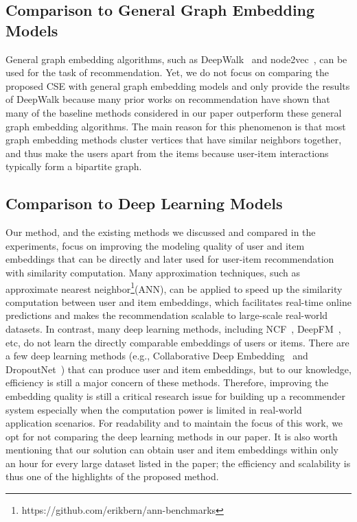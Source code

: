 \documentclass[sigconf,anonymous=false]{acmart}
\begin{document}
\subsection{Comparison to General Graph Embedding Models}
\label{sec:ge}
General graph embedding algorithms, such as DeepWalk~\cite{dw} and
node2vec~\cite{n2v}, can be used for the task of recommendation.
Yet, we do not focus on comparing the proposed CSE with general graph embedding
models and only provide the results of DeepWalk because many prior works on
recommendation \cite{e2r,nerm} have shown that many of the baseline
methods considered in our paper outperform these general graph
embedding algorithms.
The main reason for this phenomenon is that most graph embedding methods
cluster vertices that have similar neighbors together, and thus make the users
apart from the items because user-item interactions typically form a bipartite
graph. 

\subsection{Comparison to Deep Learning Models}


Our method, and the existing methods we discussed and compared in the
experiments, focus on improving the modeling quality of user and item
embeddings that can be directly and later used for user-item recommendation
with similarity computation.
Many approximation techniques, such as approximate nearest neighbor\footnote{https://github.com/erikbern/ann-benchmarks}{(ANN)}, can
be applied to speed up the similarity computation between user and item
embeddings, which facilitates real-time online predictions and makes the
recommendation scalable to large-scale real-world datasets.
In contrast, many deep learning methods, including NCF~\cite{ncf}, DeepFM~\cite{deepfm},
etc, do not learn the directly comparable embeddings of users or items. There are a few
deep learning methods (e.g., Collaborative Deep Embedding~\cite{cde}
and DropoutNet~\cite{dropoutnet})
that can produce user and item embeddings, but to our knowledge, efficiency is still
a major concern of these methods. Therefore, improving the embedding quality is
still a critical research issue for building up a recommender system especially
when the computation power is limited in real-world application scenarios.
For readability and to maintain the focus of this work, we opt for not
comparing the deep learning methods in our paper.
It is also worth mentioning that our solution can obtain user and item
embeddings within only an hour for every large dataset listed in the paper; the
efficiency and scalability is thus one of the highlights of the proposed
method.
\end{document}
